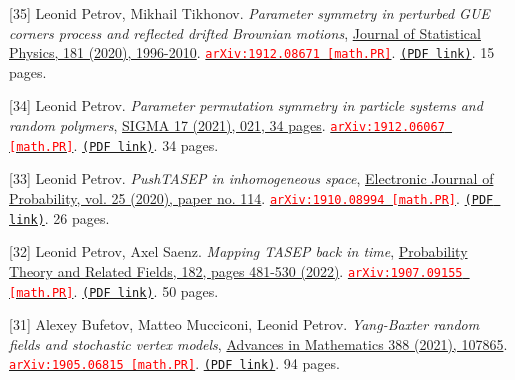 \begin{etaremune}
\item[{[35]}] 
Leonid Petrov, Mikhail Tikhonov.
\emph{Parameter symmetry in perturbed GUE corners process and reflected drifted Brownian motions}, \href{https://doi.org/10.1007/s10955-020-02652-7}{Journal of Statistical Physics, 181 (2020), 1996-2010}. 
\href{https://arxiv.org/abs/1912.08671}{\texttt{{\textcolor{red}{arXiv:1912.08671 [math.PR]}}}}. \href{https://storage.lpetrov.cc/papers/35-parameter_symmetry_in.pdf}{\texttt{(PDF link)}}. 15 pages.



\item[{[34]}] 
Leonid Petrov.
\emph{Parameter permutation symmetry in particle systems and random polymers}, \href{https://www.emis.de/journals/SIGMA/2021/021/}{SIGMA 17 (2021), 021, 34 pages}. 
\href{https://arxiv.org/abs/1912.06067}{\texttt{{\textcolor{red}{arXiv:1912.06067 [math.PR]}}}}. \href{https://storage.lpetrov.cc/papers/34-parameter_permutation_symmetry.pdf}{\texttt{(PDF link)}}. 34 pages.



\item[{[33]}] 
Leonid Petrov.
\emph{PushTASEP in inhomogeneous space}, \href{https://doi.org/10.1214/20-EJP517}{Electronic Journal of Probability, vol. 25 (2020), paper no. 114}. 
\href{https://arxiv.org/abs/1910.08994}{\texttt{{\textcolor{red}{arXiv:1910.08994 [math.PR]}}}}. \href{https://storage.lpetrov.cc/papers/33-pushtasep_in_inhomogeneous.pdf}{\texttt{(PDF link)}}. 26 pages.









\item[{[32]}] 
Leonid Petrov, Axel Saenz.
\emph{Mapping TASEP back in time}, \href{https://doi.org/10.1007/s00440-021-01074-0}{Probability Theory and Related Fields, 182, pages 481-530 (2022)}. 
\href{https://arxiv.org/abs/1907.09155}{\texttt{{\textcolor{red}{arXiv:1907.09155 [math.PR]}}}}. \href{https://storage.lpetrov.cc/papers/32-mapping_tasep_back.pdf}{\texttt{(PDF link)}}. 50 pages.









\item[{[31]}] 
Alexey Bufetov, Matteo Mucciconi, Leonid Petrov.
\emph{Yang-Baxter random fields and stochastic vertex models}, \href{https://www.sciencedirect.com/science/article/pii/S0001870821003042}{Advances in Mathematics 388 (2021), 107865}. 
\href{https://arxiv.org/abs/1905.06815}{\texttt{{\textcolor{red}{arXiv:1905.06815 [math.PR]}}}}. \href{https://storage.lpetrov.cc/papers/31-yangbaxter_random_fields.pdf}{\texttt{(PDF link)}}. 94 pages.














\end{etaremune}

